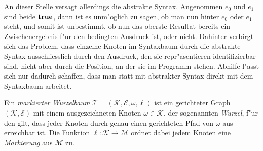 \documentclass[12pt,a4paper]{article}
\begin{document}
An dieser Stelle versagt allerdings die abstrakte Syntax. Angenommen $e_0$ und $e_1$ sind beide $\mathbf{true}$,
dann ist es unm"oglich zu sagen, ob man nun hinter $e_0$ oder $e_1$ steht, und somit ist unbestimmt,
ob nun das oberste Resultat bereits ein Zwischenergebnis f"ur den bedingten Ausdruck ist, oder nicht.
Dahinter verbirgt sich das Problem, dass einzelne Knoten im Syntaxbaum durch die abstrakte Syntax
ausschliesslich durch den Ausdruck, den sie repr"asentieren identifizierbar sind, nicht aber durch
die Position, an der sie im Programm stehen. Abhilfe l"asst sich nur dadurch schaffen, dass man
statt mit abstrakter Syntax direkt mit dem Syntaxbaum arbeitet.

\begin{definition}
  Ein \emph{markierter Wurzelbaum} \linebreak
  $\mathcal{T} = (\mathcal{K}, \mathcal{E}, \omega, \ell)$ ist ein gerichteter
  Graph $(\mathcal{K}, \mathcal{E})$ mit einem ausgezeichneten Knoten $\omega \in \mathcal{K}$, der
  sogenannten \emph{Wurzel}, f"ur den gilt, dass jeder Knoten durch genau einen gerichteten Pfad von
  $\omega$ aus erreichbar ist. Die Funktion $\ell: \mathcal{K} \to \mathcal{M}$ ordnet dabei jedem
  Knoten eine \emph{Markierung} aus $\mathcal{M}$ zu.
\end{definition}
\end{document}
